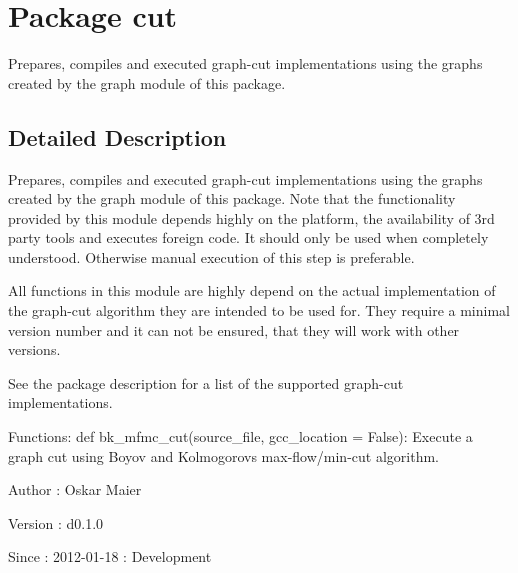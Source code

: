 \hypertarget{namespacecut}{
\section{Package cut}
\label{namespacecut}
}


Prepares, compiles and executed graph-\/cut implementations using the graphs created by the graph module of this package.  




\subsection{Detailed Description}
Prepares, compiles and executed graph-\/cut implementations using the graphs created by the graph module of this package. Note that the functionality provided by this module depends highly on the platform, the availability of 3rd party tools and executes foreign code. It should only be used when completely understood. Otherwise manual execution of this step is preferable.

All functions in this module are highly depend on the actual implementation of the graph-\/cut algorithm they are intended to be used for. They require a minimal version number and it can not be ensured, that they will work with other versions.

See the package description for a list of the supported graph-\/cut implementations.

Functions: def bk\_\-mfmc\_\-cut(source\_\-file, gcc\_\-location = False): Execute a graph cut using Boyov and Kolmogorovs max-\/flow/min-\/cut algorithm.

\begin{DoxyAuthor}{Author}
: Oskar Maier 
\end{DoxyAuthor}
\begin{DoxyVersion}{Version}
: d0.1.0 
\end{DoxyVersion}
\begin{DoxySince}{Since}
: 2012-\/01-\/18 : Development 
\end{DoxySince}
